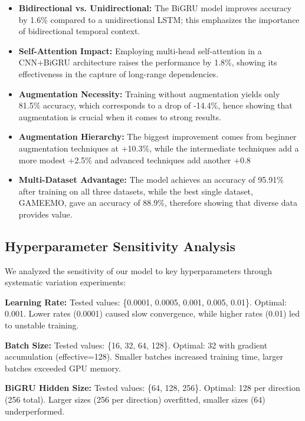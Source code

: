 \documentclass[conference]{IEEEtran}
\begin{document}
\begin{itemize}
    \item \textbf{Bidirectional vs. Unidirectional:} The BiGRU model improves accuracy by 1.6\% compared to a unidirectional LSTM; this emphasizes the importance of bidirectional temporal context.
    
    \item \textbf{Self-Attention Impact:} Employing multi-head self-attention in a CNN+BiGRU architecture raises the performance by 1.8\%, showing its effectiveness in the capture of long-range dependencies.
    
    \item \textbf{Augmentation Necessity:} Training without augmentation yields only 81.5\% accuracy, which corresponds to a drop of -14.4\%, hence showing that augmentation is crucial when it comes to strong results.
    
    \item \textbf{Augmentation Hierarchy:} The biggest improvement comes from beginner augmentation techniques at +10.3\%, while the intermediate techniques add a more modest +2.5\% and advanced techniques add another +0.8%
    
    \item \textbf{Multi-Dataset Advantage:} The model achieves an accuracy of 95.91\% after training on all three datasets, while the best single dataset, GAMEEMO, gave an accuracy of 88.9\%, therefore showing that diverse data provides value.
\end{itemize}

\subsection{Hyperparameter Sensitivity Analysis}

We analyzed the sensitivity of our model to key hyperparameters through systematic variation experiments:

\textbf{Learning Rate:} Tested values: \{0.0001, 0.0005, 0.001, 0.005, 0.01\}. Optimal: 0.001. Lower rates (0.0001) caused slow convergence, while higher rates (0.01) led to unstable training.

\textbf{Batch Size:} Tested values: \{16, 32, 64, 128\}. Optimal: 32 with gradient accumulation (effective=128). Smaller batches increased training time, larger batches exceeded GPU memory.

\textbf{BiGRU Hidden Size:} Tested values: \{64, 128, 256\}. Optimal: 128 per direction (256 total). Larger sizes (256 per direction) overfitted, smaller sizes (64) underperformed.
\end{document}

